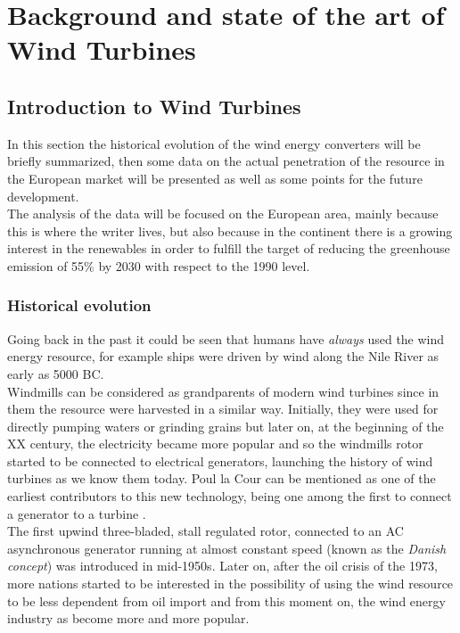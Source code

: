 \newpage
\section{Background and state of the art of Wind Turbines}\label{sec:c_state_of_the_art}
\subsection{Introduction to Wind Turbines}\label{subsec:c_WT_characteristics}
In this section the historical evolution of the wind energy converters will be briefly summarized, then some data on the actual penetration of the resource in the European market will be presented as well as some points for the future development. \\
The analysis of the data will be focused on the European area, mainly because this is where the writer lives, but also because in the continent there is a growing interest in the renewables in order to fulfill the target of reducing the greenhouse emission of 55\% by 2030 with respect to the 1990 level. 

\subsubsection{Historical evolution}
Going back in the past it could be seen that humans have \textit{always} used the wind energy resource, for example ships were driven by wind along the Nile River as early as 5000 BC.\\
Windmills can be considered as grandparents of modern wind turbines since in them the resource were harvested in a similar way. Initially, they were used for directly pumping waters or grinding grains but later on, at the beginning of the XX century, the electricity became more popular and so the windmills rotor started to be connected to electrical generators, launching the history of wind turbines as we know them today. Poul la Cour can be mentioned as one of the earliest contributors to this new technology, being one among the first to connect a generator to a turbine \cite{Aerodynamics_of_wind_turbines}. \\
The first upwind three-bladed, stall regulated rotor, connected to an AC asynchronous generator running at almost constant speed (known as the \textit{Danish concept}) was introduced in mid-1950s. Later on, after the oil crisis of the 1973, more nations started to be interested in the possibility of using the wind resource to be less dependent from oil import and from this moment on, the wind energy industry as become more and more popular. 

